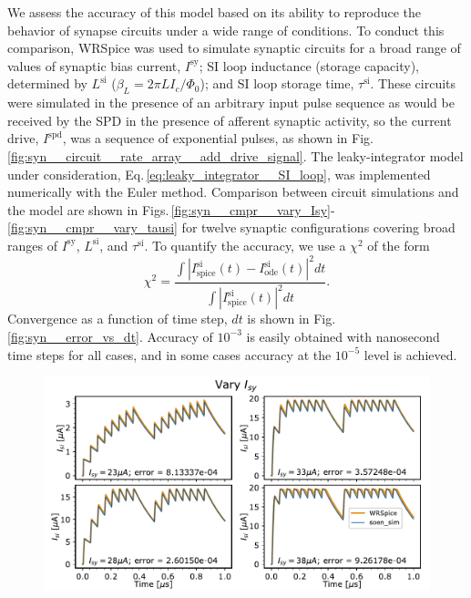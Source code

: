 \documentclass[twocolumn]{article}
\begin{document}
We assess the accuracy of this model based on its ability to reproduce the behavior of synapse circuits under a wide range of conditions. To conduct this comparison, WRSpice was used to simulate synaptic circuits for a broad range of values of synaptic bias current, $I^{\mathrm{sy}}$; SI loop inductance (storage capacity), determined by $L^{\mathrm{si}}$ ($\beta_L = 2\pi L I_c/\Phi_0$); and SI loop storage time, $\tau^{\mathrm{si}}$. These circuits were simulated in the presence of an arbitrary input pulse sequence as would be received by the SPD in the presence of afferent synaptic activity, so the current drive, $I^{\mathrm{spd}}$, was a sequence of exponential pulses, as shown in Fig.\,\ref{fig:syn__circuit__rate_array__add_drive_signal}. The leaky-integrator model under consideration, Eq.\,\ref{eq:leaky_integrator__SI_loop}, was implemented numerically with the Euler method. Comparison between circuit simulations and the model are shown in Figs.\,\ref{fig:syn__cmpr__vary_Isy}-\ref{fig:syn__cmpr__vary_tausi} for twelve synaptic configurations covering broad ranges of $I^{\mathrm{sy}}$, $L^{\mathrm{si}}$, and $\tau^{\mathrm{si}}$. To quantify the accuracy, we use a $\chi^2$ of the form
\begin{equation}
\label{eq:chi_squared}
\chi^2 = \frac{\int \left|I^{\mathrm{si}}_{\mathrm{spice}}(t) - I^{\mathrm{si}}_{\mathrm{ode}}(t)\right|^2 dt}{\int \left|I^{\mathrm{si}}_{\mathrm{spice}}(t)\right|^2 dt}.
\end{equation}
Convergence as a function of time step, $dt$ is shown in Fig.\,\ref{fig:syn__error_vs_dt}. Accuracy of $10^{-3}$ is easily obtained with nanosecond time steps for all cases, and in some cases accuracy at the $10^{-5}$ level is achieved. 


\begin{figure}[htb]
\includegraphics[width=17.2cm]{figures/_04__syn__cmpr__vary_Isy.pdf}
\end{figure}
\end{document}
